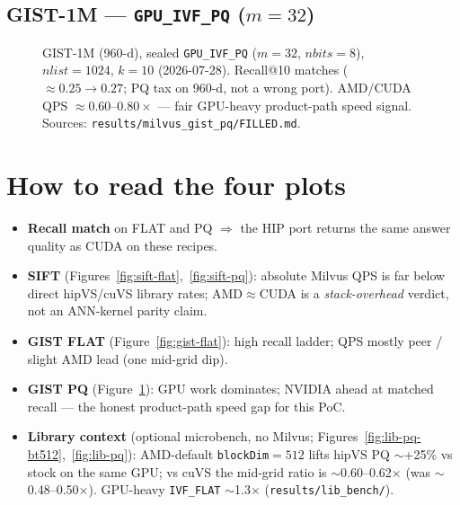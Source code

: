 \documentclass[11pt,a4paper]{article}
\begin{document}
\subsection{GIST-1M --- \texttt{GPU\_IVF\_PQ} ($m{=}32$)}
\label{sec:gist-pq}

\begin{figure}[H]
\centering
{}
\caption{GIST-1M (960-d), sealed \texttt{GPU\_IVF\_PQ} ($m{=}32$, $nbits{=}8$),
$nlist{=}1024$, $k{=}10$ (2026-07-28).
Recall@10 matches ($\approx0.25\rightarrow0.27$; PQ tax on 960-d, not a wrong port).
AMD/CUDA QPS $\approx 0.60$--$0.80\times$ --- fair GPU-heavy product-path speed signal.
Sources: \texttt{results/milvus\_gist\_pq/FILLED.md}.}
\label{fig:gist-pq}
\end{figure}

\section{How to read the four plots}
\label{sec:read}

\begin{itemize}[leftmargin=*]
  \item \textbf{Recall match} on FLAT and PQ $\Rightarrow$ the HIP port returns the
        same answer quality as CUDA on these recipes.
  \item \textbf{SIFT} (Figures~\ref{fig:sift-flat},~\ref{fig:sift-pq}): absolute
        Milvus QPS is far below direct hipVS/cuVS library rates; AMD$\approx$CUDA is a
        \emph{stack-overhead} verdict, not an ANN-kernel parity claim.
  \item \textbf{GIST FLAT} (Figure~\ref{fig:gist-flat}): high recall ladder;
        QPS mostly peer / slight AMD lead (one mid-grid dip).
  \item \textbf{GIST PQ} (Figure~\ref{fig:gist-pq}): GPU work dominates; NVIDIA ahead
        at matched recall --- the honest product-path speed gap for this PoC.
  \item \textbf{Library context} (optional microbench, no Milvus;
        Figures~\ref{fig:lib-pq-bt512},~\ref{fig:lib-pq}):
        AMD-default \texttt{blockDim}${=}512$ lifts hipVS PQ $\sim$+25\% vs stock
        on the same GPU; vs cuVS the mid-grid ratio is $\sim$0.60--0.62$\times$
        (was $\sim$0.48--0.50$\times$). GPU-heavy \texttt{IVF\_FLAT} $\sim$1.3$\times$
        (\texttt{results/lib\_bench/}).
\end{itemize}
\end{document}
